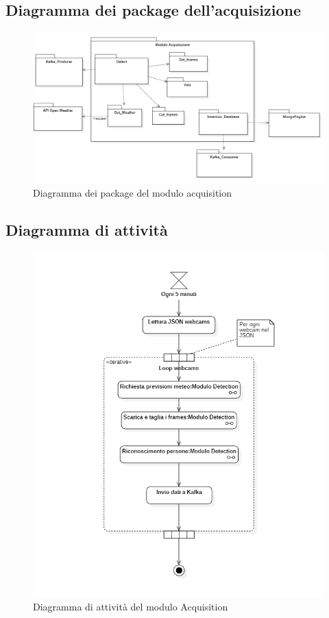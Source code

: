 \subsection{Diagramma dei package dell'acquisizione}\label{DiagrammaDeiPackageAcquisition}
\begin{center}
	\begin{figure}[H]
		\centering\includegraphics[scale=0.65]{../immagini/diag_PB/diag_pack_acqui.png}
		\caption{Diagramma dei package del modulo acquisition}
	\end{figure}
\end{center}

\subsection{Diagramma di attività}
\begin{center}
	\begin{figure}[H]
		\centering\includegraphics[scale=0.65]
    {../immagini/diag_PB/detection.png}
		\caption{Diagramma di attività del modulo Acquisition}
	\end{figure}
\end{center}


